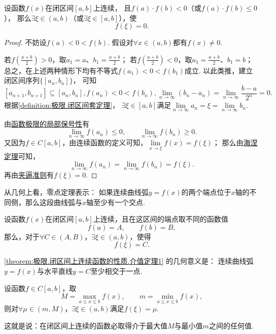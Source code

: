 \begin{theorem}[零点定理]\label{theorem:极限.闭区间上连续函数的性质.零点定理}
设函数\(f(x)\)在闭区间\([a,b]\)上连续，%
且\(f(a) \cdot f(b)<0\)（或\(f(a) \cdot f(b) \leqslant 0\)），%
那么\(\exists\xi\in(a,b)\)（或\(\exists\xi\in[a,b]\)），使\[
f(\xi) = 0.
\]
\begin{proof}
不妨设\(f(a) < 0 < f(b)\).
假设对\(\forall x\in(a,b)\)都有\(f(x) \neq 0\).

若\(f\left(\frac{a+b}{2}\right)>0\)，取\(a_1=a\)、\(b_1=\frac{a+b}{2}\)；
若\(f\left(\frac{a+b}{2}\right)<0\)，取\(a_1=\frac{a+b}{2}\)、\(b_1=b\)；
总之，在上述两种情形下均有不等式\(f(a_1) < 0 < f(b_1)\)成立.
以此类推，建立闭区间序列\(\{[a_n,b_n]\}\)，%
可知\[
[a_{n+1},b_{n+1}] \subseteq [a_n,b_n],
f(a_n) < 0 < f(b_n),
\lim\limits_{n\to\infty} (b_n - a_n)
= \lim\limits_{n\to\infty} \frac{b-a}{2^n}
= 0.
\]
根据\cref{definition:极限.闭区间套定理}，%
\(\exists\xi\in[a,b]\)满足\(\lim\limits_{n\to\infty} a_n
= \xi
= \lim\limits_{n\to\infty} b_n\).

由\hyperref[theorem:极限.函数极限的局部保号性3]{函数极限的局部保号性}有\[
\lim\limits_{n\to\infty} f(a_n) \leqslant 0,
\qquad
\lim\limits_{n\to\infty} f(b_n) \geqslant 0.
\]
又因为\(f \in C[a,b]\)，由连续函数的定义可知，\(\lim\limits_{x\to\xi} f(x) = f(\xi)\)；
那么由\hyperref[theorem:极限.海涅定理]{海涅定理}可知，\[
\lim\limits_{n\to\infty} f(a_n)
= \lim\limits_{n\to\infty} f(b_n)
= f(\xi).
\]再由\hyperref[theorem:极限.夹逼准则]{夹逼准则}有\(f(\xi)=0\).
\end{proof}
\end{theorem}
从几何上看，零点定理表示：
如果连续曲线弧\(y = f(x)\)的两个端点位于\(x\)轴的不同侧，那么这段曲线弧与\(x\)轴至少有一个交点.

\begin{theorem}[介值定理]\label{theorem:极限.闭区间上连续函数的性质.介值定理1}
设函数\(f(x)\)在闭区间\([a,b]\)上连续，且在这区间的端点取不同的函数值\[
f(a) = A, \qquad
f(b) = B,
\]那么，对于\(\forall C \in (A,B)\)，\(\exists \xi \in (a,b)\)，使得\[
f(\xi) = C.
\]
\end{theorem}
\cref{theorem:极限.闭区间上连续函数的性质.介值定理1} 的几何意义是：
连续曲线弧\(y=f(x)\)与水平直线\(y=C\)至少相交于一点.

\begin{corollary}\label{theorem:极限.闭区间上连续函数的性质.介值定理2}
设函数\(f \in C[a,b]\)，取\[
M=\max\limits_{a \leqslant x \leqslant b} f(x), \qquad
m=\min\limits_{a \leqslant x \leqslant b} f(x),
\]则对\(\forall\mu\in(m,M)\)，\(\exists\xi\in(a,b)\)满足\(f(\xi)=\mu\).
\end{corollary}
这就是说：在闭区间上连续的函数必取得介于最大值\(M\)与最小值\(m\)之间的任何值.

